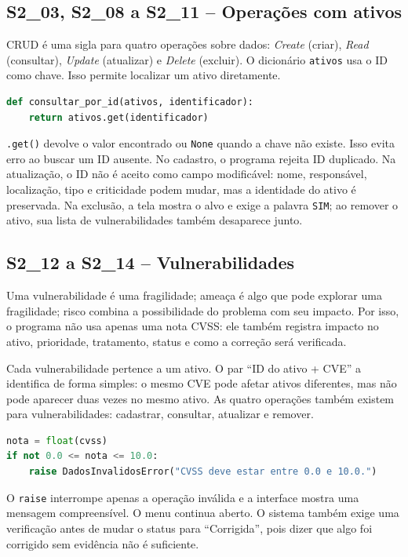 \documentclass[11pt,a4paper]{article}
\newcommand{\cardsection}[1]{\Needspace{12\baselineskip}\subsection{#1}}
\begin{document}
\cardsection{S2\_03, S2\_08 a S2\_11 -- Operações com ativos}

CRUD é uma sigla para quatro operações sobre dados: \emph{Create} (criar), \emph{Read} (consultar), \emph{Update} (atualizar) e \emph{Delete} (excluir). O dicionário \texttt{ativos} usa o ID como chave. Isso permite localizar um ativo diretamente.

\begin{lstlisting}[language=Python,caption={Busca direta pela chave do dicionário}]
def consultar_por_id(ativos, identificador):
    return ativos.get(identificador)
\end{lstlisting}

\texttt{.get()} devolve o valor encontrado ou \texttt{None} quando a chave não existe. Isso evita erro ao buscar um ID ausente. No cadastro, o programa rejeita ID duplicado. Na atualização, o ID não é aceito como campo modificável: nome, responsável, localização, tipo e criticidade podem mudar, mas a identidade do ativo é preservada. Na exclusão, a tela mostra o alvo e exige a palavra \texttt{SIM}; ao remover o ativo, sua lista de vulnerabilidades também desaparece junto.

\cardsection{S2\_12 a S2\_14 -- Vulnerabilidades}

Uma vulnerabilidade é uma fragilidade; ameaça é algo que pode explorar uma fragilidade; risco combina a possibilidade do problema com seu impacto. Por isso, o programa não usa apenas uma nota CVSS: ele também registra impacto no ativo, prioridade, tratamento, status e como a correção será verificada.

Cada vulnerabilidade pertence a um ativo. O par ``ID do ativo + CVE'' a identifica de forma simples: o mesmo CVE pode afetar ativos diferentes, mas não pode aparecer duas vezes no mesmo ativo. As quatro operações também existem para vulnerabilidades: cadastrar, consultar, atualizar e remover.

\begin{lstlisting}[language=Python,caption={Validação simples do CVSS}]
nota = float(cvss)
if not 0.0 <= nota <= 10.0:
    raise DadosInvalidosError("CVSS deve estar entre 0.0 e 10.0.")
\end{lstlisting}

O \texttt{raise} interrompe apenas a operação inválida e a interface mostra uma mensagem compreensível. O menu continua aberto. O sistema também exige uma verificação antes de mudar o status para ``Corrigida'', pois dizer que algo foi corrigido sem evidência não é suficiente.
\end{document}
